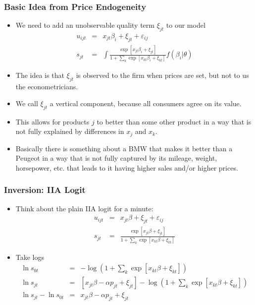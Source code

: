 \documentclass[aspectratio=169,11pt]{beamer}
\begin{document}
\begin{frame}
\frametitle{Basic Idea from Price Endogeneity}
 \begin{itemize}
\item We need to add an unobservable quality term $\xi_{jt}$ to our model
\begin{eqnarray*}
u_{ijt} &=& x_{jt} \beta_i + \xi_{jt} +  \varepsilon_{ij} \\
s_{jt} &=& \int \frac{\exp[x_{jt} \beta_i + \xi_{jt} ]}{1+\sum_k \exp[x_{kt} \beta_i + \xi_{kt} ]} f(\beta_i | \theta)
\end{eqnarray*}
\item The idea is that $\xi_{jt}$ is observed to the firm when prices are set, but not to us the econometricians.
\item We call $\xi_{jt}$ a vertical component, because all consumers agree on its value.
\item This allows for products $j$ to better than some other product in a way that is not fully explained by differences in $x_j$ and $x_k$.
\item Basically there is something about a BMW that makes it better than a Peugeot in a way that is not fully captured by its mileage, weight, horsepower, etc. that leads to it having higher sales and/or higher prices.
 \end{itemize}
\end{frame}

\begin{frame}
\frametitle{Inversion: IIA Logit}
 \begin{itemize}
\item Think about the plain IIA logit for a minute:
\begin{eqnarray*}
u_{ijt} &=& x_{jt} \beta + \xi_{jt} +  \varepsilon_{ij} \\
s_{jt} &=& \frac{\exp[x_{jt} \beta + \xi_{jt} ]}{1+\sum_k \exp[x_{kt} \beta + \xi_{kt} ]} 
\end{eqnarray*}
\item Take logs
\begin{eqnarray*}
\ln s_{0t} &=& -\log \left(1+\sum_k \exp[x_{kt} \beta + \xi_{kt}] \right) \\
\ln s_{jt} &=& [x_{jt} \beta - \alpha p_{jt} +  \xi_{jt} ] - \log \left(1+\sum_k \exp[x_{kt} \beta + \xi_{kt}] \right)\\
\ln s_{jt}- \ln s_{0t} &=& x_{jt} \beta -\alpha p_{jt} +  \xi_{jt}
\end{eqnarray*}
 \end{itemize}
\end{frame}
\end{document}
